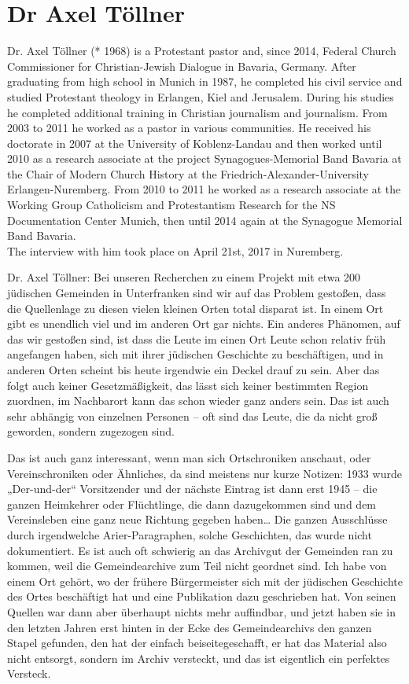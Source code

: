 \section{Dr Axel Töllner}

Dr. Axel Töllner (* 1968) is a Protestant pastor and, since 2014, Federal Church Commissioner for Christian-Jewish Dialogue in Bavaria, Germany. After graduating from high school in Munich in 1987, he completed his civil service and studied Protestant theology in Erlangen, Kiel and Jerusalem. During his studies he completed additional training in Christian journalism and journalism. From 2003 to 2011 he worked as a pastor in various communities. He received his doctorate in 2007 at the University of Koblenz-Landau and then worked until 2010 as a research associate at the project Synagogues-Memorial Band Bavaria at the Chair of Modern Church History at the Friedrich-Alexander-University Erlangen-Nuremberg. From 2010 to 2011 he worked as a research associate at the Working Group Catholicism and Protestantism Research for the NS Documentation Center Munich, then until 2014 again at the Synagogue Memorial Band Bavaria.  \\
The interview with him took place on April 21st, 2017 in Nuremberg.  

 

Dr. Axel Töllner: Bei unseren Recherchen zu einem Projekt mit etwa 200 jüdischen Gemeinden in Unterfranken sind wir auf das Problem gestoßen, dass die Quellenlage zu diesen vielen kleinen Orten total disparat ist. In einem Ort gibt es unendlich viel und im anderen Ort gar nichts. Ein anderes Phänomen, auf das wir gestoßen sind, ist dass die Leute im einen Ort Leute schon relativ früh angefangen haben, sich mit ihrer jüdischen Geschichte zu beschäftigen, und in anderen Orten scheint bis heute irgendwie ein Deckel drauf zu sein. Aber das folgt auch keiner Gesetzmäßigkeit, das lässt sich keiner bestimmten Region zuordnen, im Nachbarort kann das schon wieder ganz anders sein. Das ist auch sehr abhängig von einzelnen Personen – oft sind das Leute, die da nicht groß geworden, sondern zugezogen sind. 

Das ist auch ganz interessant, wenn man sich Ortschroniken anschaut, oder Vereinschroniken oder Ähnliches, da sind meistens nur kurze Notizen: 1933 wurde „Der-und-der“ Vorsitzender und der nächste Eintrag ist dann erst 1945 – die ganzen Heimkehrer oder Flüchtlinge, die dann dazugekommen sind und dem Vereinsleben eine ganz neue Richtung gegeben haben… Die ganzen Ausschlüsse durch irgendwelche Arier-Paragraphen, solche Geschichten, das wurde nicht dokumentiert. 
Es ist auch oft schwierig an das Archivgut der Gemeinden ran zu kommen, weil die Gemeindearchive zum Teil nicht geordnet sind. Ich habe von einem Ort gehört, wo der frühere Bürgermeister sich mit der jüdischen Geschichte des Ortes beschäftigt hat und eine Publikation dazu geschrieben hat. Von seinen Quellen war dann aber überhaupt nichts mehr auffindbar, und jetzt haben sie in den letzten Jahren erst hinten in der Ecke des Gemeindearchivs den ganzen Stapel gefunden, den hat der einfach beiseitegeschafft, er hat das Material also nicht entsorgt, sondern im Archiv versteckt, und das ist eigentlich ein perfektes Versteck. 


